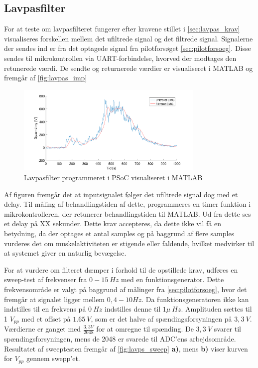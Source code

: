 \subsection{Lavpasfilter}
For at teste om lavpasfilteret fungerer efter kravene stillet i \autoref{sec:lavpas_krav} visualiseres forskellen mellem det ufiltrede signal og det filtrede signal. Signalerne der sendes ind er fra det optagede signal fra pilotforsøget \autoref{sec:pilotforsoeg}. Disse sendes til mikrokontrollen via UART-forbindelse, hvorved der modtages den retunerede værdi. De sendte og returnerede værdier er visualiseret i MATLAB og fremgår af \autoref{fig:lavpas_imp}

\begin{figure}[H]
\centering
\includegraphics[width=0.8\textwidth]{figures/EMG_test}
\caption{Lavpasfilter programmeret i PSoC visualiseret i MATLAB}
\label{fig:lavpas_imp}
\end{figure}

Af figuren fremgår det at inputsignalet følger det ufiltrede signal dog med et delay. Til måling af behandlingstiden af dette, programmeres en timer funktion i mikrokontrolleren, der retunerer behandlingstiden til MATLAB. Ud fra dette ses et delay på XX sekunder. Dette krav accepteres, da dette ikke vil få en betydning, da der optages et antal samples og på baggrund af flere samples vurderes det om muskelaktiviteten er stigende eller faldende, hvilket medvirker til at systemet giver en naturlig bevægelse.


For at vurdere om filteret dæmper i forhold til de opstillede krav, udføres en sweep-test af frekvenser fra $0-15~Hz$ med en funktionsgenerator. Dette frekvensområde er valgt på baggrund af målinger fra \autoref{sec:pilotforsoeg}, hvor det fremgår at signalet ligger mellem $0,4-10Hz$.  Da funktionsgeneratoren ikke kan indstilles til en frekvens på $0~Hz$ indstilles denne til $1 \mu~Hz$. Amplituden sættes til 1 $V_{pp}$ med et offset på $1.65~V$, som er det halve af spændingsforsyningen på $3,3~V$. Værdierne er ganget med $\frac{3,3V}{2048}$ for at omregne til spænding. De $3,3~V$ svarer til spændingsforsyningen, mens de 2048 er svarede til ADC'ens arbejdsområde. Resultatet af sweeptesten fremgår af \autoref{fig:lavps_sweep} \textbf{a)}, mens \textbf{b)} viser kurven for $V_{pp}$ gennem swepp'et.

